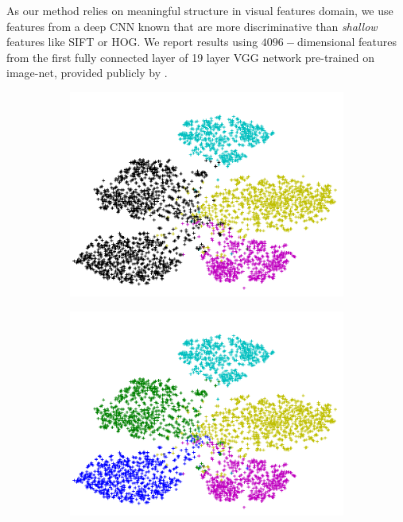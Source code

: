\documentclass[letterpaper]{article}
\begin{document}
As our method relies on meaningful structure in visual features domain, we use features from a deep CNN known that are
 more discriminative than \textit{shallow} features like SIFT or HOG. We report results using
  $4096-$dimensional features from the first fully connected layer of 19 layer VGG network \cite{vgg}
pre-trained on image-net, provided publicly by \cite{sse}.
\begin{figure}[t]
  \centering
  \begin{subfigure}[b]{0.27\linewidth}
    \includegraphics[width=\linewidth]{figure_1}
    \caption{}
    \label{fig:null}
  \end{subfigure}
%
  \begin{subfigure}[b]{0.27\linewidth}
    \includegraphics[width=\linewidth]{figure_1_true}

\end{subfigure}
\end{figure}
\end{document}
